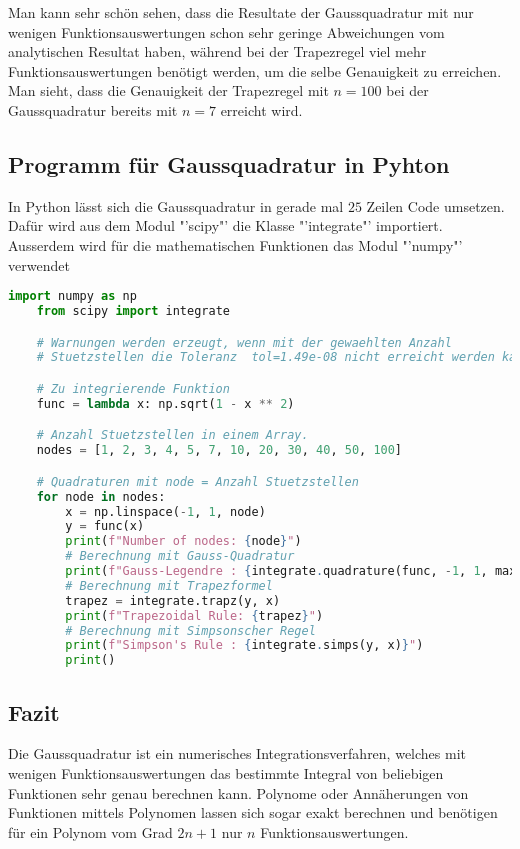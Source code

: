 Man kann sehr schön sehen, dass die Resultate der Gaussquadratur mit nur wenigen Funktionsauswertungen
schon sehr geringe Abweichungen vom analytischen Resultat haben, während bei der Trapezregel
viel mehr Funktionsauswertungen benötigt werden, um die selbe Genauigkeit zu erreichen.
Man sieht, dass die Genauigkeit der Trapezregel mit $n = 100$ bei der Gaussquadratur bereits mit $n = 7$
erreicht wird.

\subsection{Programm für Gaussquadratur in Pyhton}
In Python lässt sich die Gaussquadratur in gerade mal $25$ Zeilen Code umsetzen.
Dafür wird aus dem Modul "'scipy"' die Klasse "'integrate"' importiert. 
Ausserdem wird für die mathematischen Funktionen das Modul "'numpy"' verwendet
\begin{lstlisting}[float, language=Python]
    import numpy as np
    from scipy import integrate

    # Warnungen werden erzeugt, wenn mit der gewaehlten Anzahl
    # Stuetzstellen die Toleranz  tol=1.49e-08 nicht erreicht werden kann

    # Zu integrierende Funktion
    func = lambda x: np.sqrt(1 - x ** 2)

    # Anzahl Stuetzstellen in einem Array. 
    nodes = [1, 2, 3, 4, 5, 7, 10, 20, 30, 40, 50, 100]

    # Quadraturen mit node = Anzahl Stuetzstellen
    for node in nodes:
        x = np.linspace(-1, 1, node)
        y = func(x)
        print(f"Number of nodes: {node}")
        # Berechnung mit Gauss-Quadratur
        print(f"Gauss-Legendre : {integrate.quadrature(func, -1, 1, maxiter=node)}")
        # Berechnung mit Trapezformel
        trapez = integrate.trapz(y, x)
        print(f"Trapezoidal Rule: {trapez}")
        # Berechnung mit Simpsonscher Regel
        print(f"Simpson's Rule : {integrate.simps(y, x)}")
        print()
\end{lstlisting}


\subsection{Fazit}
Die Gaussquadratur ist ein numerisches Integrationsverfahren, welches
mit wenigen Funktionsauswertungen das bestimmte Integral von beliebigen
Funktionen sehr genau berechnen kann. 
Polynome oder Annäherungen von Funktionen mittels Polynomen lassen sich 
sogar exakt berechnen und benötigen für ein Polynom vom Grad $2n+1$ nur 
$n$ Funktionsauswertungen.

